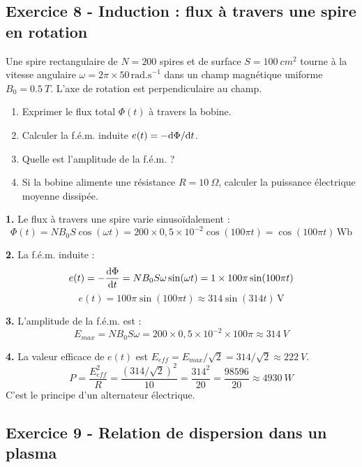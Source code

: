 \documentclass[12pt,a4paper]{article}
\begin{document}
\subsection*{Exercice 8 - Induction : flux à travers une spire en rotation \niveau{\moyen}}

\begin{boiteexercice}
Une spire rectangulaire de $N = 200$ spires et de surface $S = \qty{100}{cm^2}$ tourne à la vitesse angulaire $\omega = 2\pi\times50\,\text{rad.s}^{-1}$ dans un champ magnétique uniforme $B_0 = \qty{0.5}{T}$. L'axe de rotation est perpendiculaire au champ.
\begin{enumerate}
  \item Exprimer le flux total $\Phi(t)$ à travers la bobine.
  \item Calculer la f.é.m. induite $e(t) = -\mathrm{d}\Phi/\mathrm{d} t$.
  \item Quelle est l'amplitude de la f.é.m. ?
  \item Si la bobine alimente une résistance $R = \qty{10}{\Omega}$, calculer la puissance électrique moyenne dissipée.
\end{enumerate}
\end{boiteexercice}

\begin{boitecorrige}
\textbf{1.} Le flux à travers une spire varie sinusoïdalement :
\[
\Phi(t) = NB_0S\cos(\omega t) = 200\times0{,}5\times10^{-2}\cos(100\pi t) = \cos(100\pi t)\,\text{Wb}
\]

\textbf{2.} La f.é.m. induite :
\[
e(t) = -\dfrac{\mathrm{d} \Phi}{\mathrm{d} t} = NB_0S\omega\sin(\omega t) = 1\times100\pi\sin(100\pi t)
\]
\[
e(t) = 100\pi\sin(100\pi t) \approx 314\sin(314t)\,\text{V}
\]

\textbf{3.} L'amplitude de la f.é.m. est :
\[
E_{max} = NB_0S\omega = 200\times0{,}5\times10^{-2}\times100\pi \approx \qty{314}{V}
\]

\textbf{4.} La valeur efficace de $e(t)$ est $E_{eff} = E_{max}/\sqrt{2} = 314/\sqrt{2} \approx \qty{222}{V}$.
\[
P = \frac{E_{eff}^2}{R} = \frac{(314/\sqrt{2})^2}{10} = \frac{314^2}{20} = \frac{98596}{20} \approx \qty{4930}{W}
\]
C'est le principe d'un alternateur électrique.
\end{boitecorrige}

\subsection*{Exercice 9 - Relation de dispersion dans un plasma \niveau{\difficile}}
\end{document}
